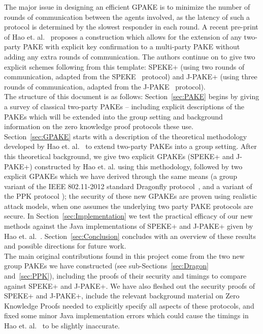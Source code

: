 \documentclass{amsart}
\theoremstyle{remark}
\begin{document}
The major issue in designing an efficient GPAKE is to minimize the number of rounds of communication 
between the agents involved, as the latency of such a protocol is determined by the slowest responder 
in each round.  A recent pre-print of Hao et. al.~\cite{HaYiChSh15} proposes a construction which 
allows for the extension of any two-party PAKE with explicit key confirmation to a multi-party PAKE 
without adding any extra rounds of communication.  The authors continue on to give two explicit schemes 
following from this template: SPEKE+ (using two rounds of communication, adapted from the SPEKE~\cite{Ja96} 
protocol) and J-PAKE+ (using three rounds of communication, adapted from the J-PAKE~\cite{HaRy2010} protocol).
\\ 

The structure of this document is as follows: Section~\ref{sec:PAKE} begins by giving a survey of classical 
two-party PAKEs -- including explicit descriptions of the PAKEs which will be extended into the group 
setting and background information on the zero knowledge proof protocols these use.  Section~\ref{sec:GPAKE} 
starts with a description of the theoretical methodology developed by Hao et. al.~\cite{HaYiChSh15} to extend 
two-party PAKEs into a group setting.  After this theoretical background, we give two explicit GPAKEs 
(SPEKE+ and J-PAKE+) constructed by Hao et. al. using this methodology, followed by two explicit GPAKEs 
which we have derived through the same means (a group variant of the IEEE 802.11-2012 standard Dragonfly 
protocol~\cite{Ha15}, and a variant of the PPK protocol \cite{BoMaPa00}); the security of these new GPAKEs are proven using 
realistic attack models, when one assumes the underlying two party PAKE protocols are secure.  
In Section~\ref{sec:Implementation} we test the practical efficacy of our new methods 
against the Java implementations of SPEKE+ and J-PAKE+ given by Hao et. al.~\cite{HaYiChSh15}.  Section~\ref{sec:Conclusion} 
concludes with an overview of these results and possible directions for future work.
\\ 

The main original contributions found in this project come from the two new group PAKEs we have constructed 
(see sub-Sections~\ref{sec:Dragon} and~\ref{sec:PPK}), including the proofs of their security and timings 
to compare against SPEKE+ and J-PAKE+.  We have also fleshed out the security proofs of SPEKE+ and J-PAKE+, 
include the relevant background material on Zero Knowledge Proofs needed to explicitly specify all aspects 
of these protocols, and fixed some minor Java implementation errors which could cause the timings in 
Hao et. al.~\cite{HaYiChSh15} to be slightly inaccurate.
\end{document}
